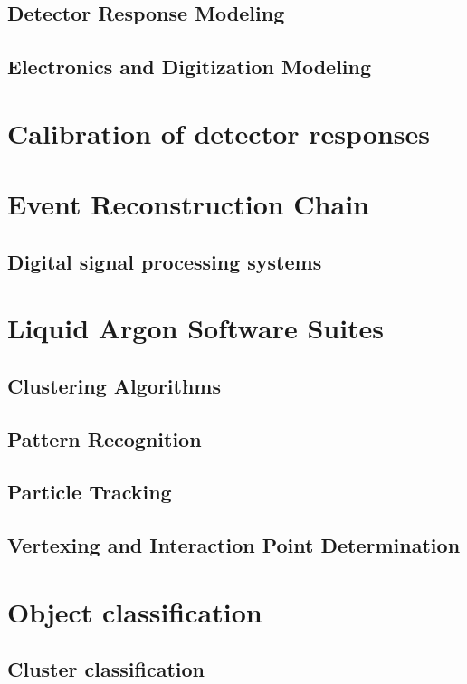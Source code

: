 \subsection{Detector Response Modeling}
\subsection{Electronics and Digitization Modeling}
\section{Calibration of detector responses}
\section{Event Reconstruction Chain}
\subsection{Digital signal processing systems}
\section{Liquid Argon Software Suites}

\subsection{Clustering Algorithms}
\subsection{Pattern Recognition}
\subsection{Particle Tracking}
\subsection{Vertexing and Interaction Point Determination}
\section{Object classification}
\subsection{Cluster classification}
